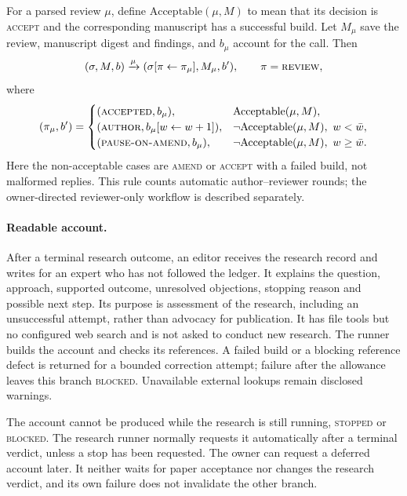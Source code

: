 \documentclass[11pt,a4paper]{article}
\newcommand{\st}[1]{\textsc{#1}}
\begin{document}
For a parsed review \(\mu\), define \(\mathrm{Acceptable}(\mu,M)\) to mean that
its decision is \st{accept} and the corresponding manuscript has a successful
build. Let \(M_\mu\) save the review, manuscript digest and findings, and
\(b_\mu\) account for the call. Then
\[
 (\sigma,M,b)\xrightarrow{\mu}
 (\sigma[\pi\leftarrow\pi_\mu],M_\mu,b'),
 \qquad\pi=\st{review},
\]
where
\[
 (\pi_\mu,b')=
 \begin{cases}
  (\st{accepted},b_\mu),&\mathrm{Acceptable}(\mu,M),\\
  (\st{author},b_\mu[w\leftarrow w+1]),
    &\neg\mathrm{Acceptable}(\mu,M),\ w<\bar w,\\
  (\st{pause-on-amend},b_\mu),
    &\neg\mathrm{Acceptable}(\mu,M),\ w\geq\bar w.
 \end{cases}
\]
Here the non-acceptable cases are \st{amend} or \st{accept} with a failed build,
not malformed replies. This rule counts automatic author--reviewer rounds; the
owner-directed reviewer-only workflow is described separately.

\paragraph{Readable account.}
After a terminal research outcome, an editor receives the research record and
writes for an expert who has not followed the ledger. It explains the question,
approach, supported outcome, unresolved objections, stopping reason and possible
next step. Its purpose is assessment of the research, including an unsuccessful
attempt, rather than advocacy for publication. It has file tools but no
configured web search and is not asked to conduct new research. The runner
builds the account and checks its references. A failed build or a blocking
reference defect is returned for a bounded correction attempt; failure after the
allowance leaves this branch \st{blocked}. Unavailable external lookups remain
disclosed warnings.

The account cannot be produced while the research is still running, \st{stopped}
or \st{blocked}. The research runner normally requests it automatically after a
terminal verdict, unless a stop has been requested. The owner can request a
deferred account later. It neither waits for paper acceptance nor changes the
research verdict, and its own failure does not invalidate the other branch.
\end{document}
